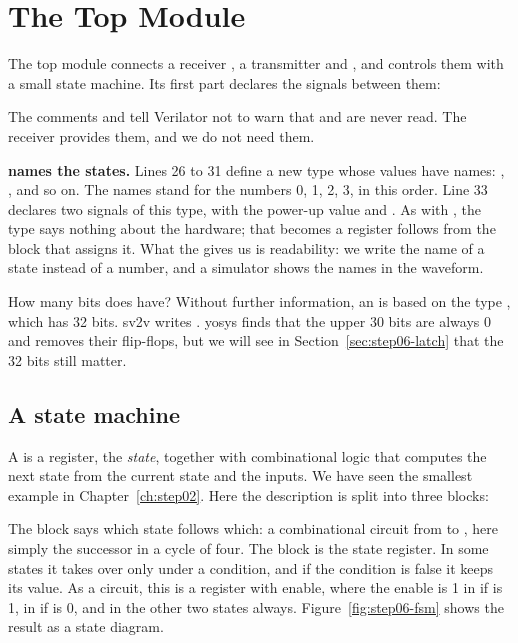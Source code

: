 \section{The Top Module}
\label{sec:step06-top}

The top module  connects a receiver , a transmitter
 and , and controls them with a small state machine.
Its first part declares the signals between them:


The comments  and  tell
Verilator not to warn that  and  are never read. The
receiver provides them, and we do not need them.

\textbf{ names the states.} Lines 26 to 31 define a new type
 whose values have names: ,
, and so on. The names stand for the numbers 0, 1, 2,
3, in this order. Line 33 declares two signals of this type,  with
the power-up value  and . As with
, the type says nothing about the hardware; that  becomes a
register follows from the  block that assigns it. What the
 gives us is readability: we write the name of a state instead of a
number, and a simulator shows the names in the waveform.

How many bits does  have? Without further information, an
 is based on the type , which has 32 bits. sv2v writes
. yosys finds that the upper 30 bits are always 0 and
removes their flip-flops, but we will see in
Section~\ref{sec:step06-latch} that the 32 bits still matter.

\subsection*{A state machine}

A  is a register, the \emph{state}, together with
combinational logic that computes the next state from the current state and
the inputs. We have seen the smallest example in Chapter~\ref{ch:step02}.
Here the description is split into three blocks:


The  block says which state follows which: a combinational
circuit from  to , here simply the successor in a
cycle of four. The  block is the state register. In some states
it takes over  only under a condition, and if the condition is
false it keeps its value. As a circuit, this is a register with enable, where
the enable is 1 in  if  is 1, in
 if  is 0, and in the other two states
always. Figure~\ref{fig:step06-fsm} shows the result as a state diagram.

